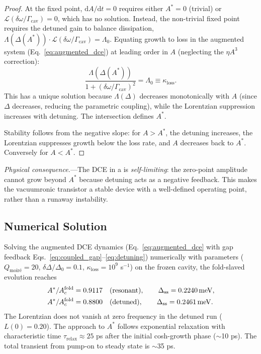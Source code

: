 \documentclass[11pt,letterpaper]{article}
\begin{document}
\begin{proof}
At the fixed point, $\mathrm{d}A/\mathrm{d}t = 0$ requires either $A^* = 0$ (trivial) or $\mathcal{L}(\delta\omega/\Gamma_{\text{cav}}) = 0$, which has no solution. Instead, the non-trivial fixed point requires the detuned gain to balance dissipation, $\Lambda(\Delta(A^*)) \cdot \mathcal{L}(\delta\omega/\Gamma_{\text{cav}}) = \Lambda_0$. Equating growth to loss in the augmented system (Eq.~\ref{eq:augmented_dce}) at leading order in $A$ (neglecting the $\eta A^3$ correction):
\begin{equation}
\frac{\Lambda(\Delta(A^*))}{1 + (\delta\omega / \Gamma_{\text{cav}})^2} = \Lambda_0 \equiv \kappa_{\text{loss}}.
\end{equation}
This has a unique solution because $\Lambda(\Delta)$ decreases monotonically with $A$ (since $\Delta$ decreases, reducing the parametric coupling), while the Lorentzian suppression increases with detuning. The intersection defines $A^*$.

Stability follows from the negative slope: for $A > A^*$, the detuning increases, the Lorentzian suppresses growth below the loss rate, and $A$ decreases back to $A^*$. Conversely for $A < A^*$.
\end{proof}

\textit{Physical consequence.}---The DCE in a \TEVC{} is \textit{self-limiting}: the zero-point amplitude cannot grow beyond $A^*$ because detuning acts as a negative feedback. This makes the vacuumronic transistor a stable device with a well-defined operating point, rather than a runaway instability.

\subsection{Numerical Solution}

Solving the augmented DCE dynamics (Eq.~\ref{eq:augmented_dce} with gap feedback Eqs.~\ref{eq:coupled_gap}--\ref{eq:detuning}) numerically with \MATBG{} parameters ($Q_{\text{moir\'{e}}} = 20$, $\delta\Delta/\Delta_0 = 0.1$, $\kappa_{\text{loss}} = 10^9$ s$^{-1}$) on the frozen cavity, the fold-slaved evolution reaches
\begin{align}
A^* / A_c^{\mathrm{fold}} &=0.9117 \quad\text{(resonant)},\qquad
\Delta_{\mathrm{ss}}=0.2240\,\mathrm{meV},\\
A^* / A_c^{\mathrm{fold}} &=0.8800 \quad\text{(detuned)},\qquad
\Delta_{\mathrm{ss}}=0.2461\,\mathrm{meV}.
\end{align}
The Lorentzian does not vanish at zero frequency in the detuned run ($L(0)=0.20$).
The approach to $A^*$ follows exponential relaxation with characteristic time $\tau_{\text{relax}} \approx 25$ ps after the initial cosh-growth phase ($\sim$10 ps). The total transient from pump-on to steady state is $\sim$35 ps.
\end{document}
